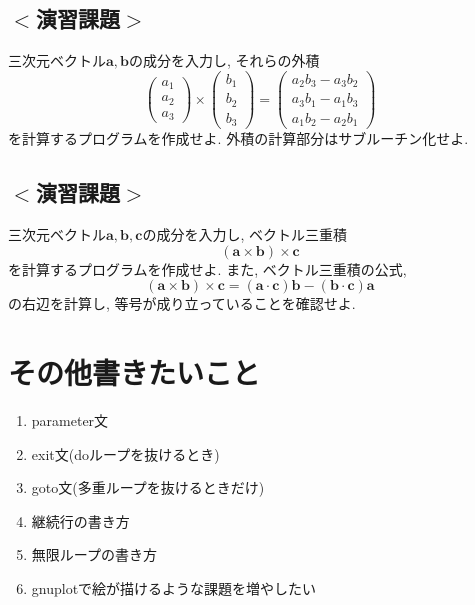 \documentclass[a4j]{jsbook}
\begin{document}
\subsection*{$<$演習課題$>$}
三次元ベクトル$\bm{a}, \bm{b}$の成分を入力し, それらの外積
\begin{equation}
\begin{pmatrix}
a_1 \\ a_2 \\ a_3
\end{pmatrix}
\times
\begin{pmatrix}
b_1 \\ b_2 \\ b_3
\end{pmatrix}
=
\begin{pmatrix}
a_2b_3-a_3b_2 \\ a_3b_1-a_1b_3 \\ a_1b_2-a_2b_1
\end{pmatrix}
\end{equation}
を計算するプログラムを作成せよ. 
外積の計算部分はサブルーチン化せよ. 
%

\subsection*{$<$演習課題$>$}
三次元ベクトル$\bm{a}, \bm{b}, \bm{c}$の成分を入力し, ベクトル三重積
\begin{equation}
(\bm{a} \times \bm{b}) \times \bm{c}
\end{equation}
を計算するプログラムを作成せよ. 
また, ベクトル三重積の公式, 
\begin{equation}
(\bm{a} \times \bm{b}) \times \bm{c} = (\bm{a} \cdot \bm{c})\bm{b} - (\bm{b} \cdot \bm{c})\bm{a}
\end{equation}
の右辺を計算し, 等号が成り立っていることを確認せよ. 
%

%
%
%


\section*{その他書きたいこと}
\begin{enumerate}
\item parameter文
\item exit文(doループを抜けるとき)
\item goto文(多重ループを抜けるときだけ)
\item 継続行の書き方
\item 無限ループの書き方
\item gnuplotで絵が描けるような課題を増やしたい
\end{enumerate}
\end{document}
